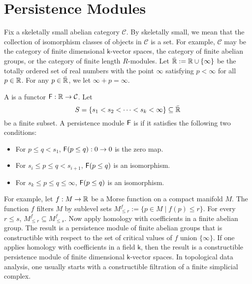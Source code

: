 \documentclass[12pt]{article}
\begin{document}
%






\section{Persistence Modules}

Fix a skeletally small abelian category $\mathcal{C}$.
By skeletally small, we mean that the collection of isomorphism classes of objects in $\mathcal{C}$
is a set.
For example, $\mathcal{C}$ may be the category of finite dimensional $\mathsf{k}$-vector spaces, 
the category of finite abelian groups, or the category of finite length $R$-modules.
Let $\bar{{\mathbb R}} := {\mathbb R} \cup \{ \infty \}$ be the totally ordered set of real numbers with the point 
$\infty$ satisfying $p < \infty$ for all $p \in {\mathbb R}$.
For any $p \in \bar {{\mathbb R}}$, we let $\infty + p = \infty$.

\begin{defn}
A  is a functor ${\mathsf{F}} : {\mathbb R} \to \mathcal{C}$.
Let 
$$S=\{s_1 < s_2 < \cdots < s_k < \infty \} \subseteq \bar {{\mathbb R}}$$ be a finite subset.
A persistence module ${\mathsf{F}}$ is  if it satisfies the following two conditions:
\begin{itemize}
\item For $p \leq q < s_1$, ${\mathsf{F}}(p \leq q) : 0 \to 0$ is the zero map.
\item For $s_i \leq p \leq q< s_{i+1}$, ${\mathsf{F}}(p \leq q)$ is an isomorphism.
\item For $s_k \leq p \leq q \leq \infty$, ${\mathsf{F}}(p \leq q)$ is an isomorphism.
\end{itemize}
\end{defn}

For example, let $f : M \to {\mathbb R}$ be a Morse function on a compact manifold $M$.
The function $f$ filters $M$ by sublevel sets $M_{\leq r}^f := \{ p \in M \; |\; f(p) \leq r \}$.
For every $r \leq s$, $M_{\leq r}^f \subseteq M_{\leq s}^f$.
Now apply homology with coefficients in a finite abelian group.
The result is a persistence module of finite abelian groups that is constructible
with respect to the set of critical values of $f$ union $\{ \infty\}$.
If one applies homology with coefficients in a field $\mathsf{k}$, then the result
is a constructible persistence module of finite dimensional $\mathsf{k}$-vector spaces.
In topological data analysis, one usually starts with a constructible filtration of a finite simplicial complex.
\end{document}
